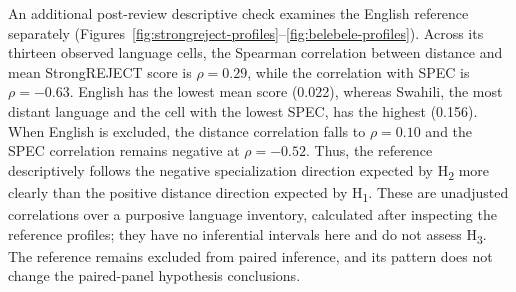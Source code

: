 An additional post-review descriptive check examines the English reference separately (Figures~\ref{fig:strongreject-profiles}--\ref{fig:belebele-profiles}). Across its thirteen observed language cells, the Spearman correlation between distance and mean StrongREJECT score is $\rho=0.29$, while the correlation with SPEC is $\rho=-0.63$. English has the lowest mean score (0.022), whereas Swahili, the most distant language and the cell with the lowest SPEC, has the highest (0.156). When English is excluded, the distance correlation falls to $\rho=0.10$ and the SPEC correlation remains negative at $\rho=-0.52$. Thus, the reference descriptively follows the negative specialization direction expected by H\textsubscript{2} more clearly than the positive distance direction expected by H\textsubscript{1}. These are unadjusted correlations over a purposive language inventory, calculated after inspecting the reference profiles; they have no inferential intervals here and do not assess H\textsubscript{3}. The reference remains excluded from paired inference, and its pattern does not change the paired-panel hypothesis conclusions.
